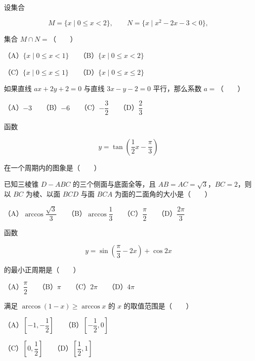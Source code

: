 \begin{question}
设集合

\nopagebreak[4]
\[
M=\{x\mid 0\leqslant x<2\},\qquad
N=\{x\mid x^2-2x-3<0\},
\]

集合 $M\cap N=$\mbox{（　　）}

（A）$\{x\mid 0\leqslant x<1\}$　　（B）$\{x\mid 0\leqslant x<2\}$

（C）$\{x\mid 0\leqslant x\leqslant 1\}$　　（D）$\{x\mid 0\leqslant x\leqslant 2\}$

\end{question}
\begin{question}
如果直线 $ax+2y+2=0$ 与直线 $3x-y-2=0$ 平行，那么系数 $a=$\mbox{（　　）}

（A）$-3$　　（B）$-6$　　（C）$-\dfrac32$　　（D）$\dfrac23$

\Needspace{0.4\textheight}
\end{question}
\begin{question}
函数

\nopagebreak[4]
\[
y=\tan\left(\dfrac12x-\dfrac\pi3\right)
\]

在一个周期内的图象是\mbox{（　　）}
\nopagebreak[4]
\begin{center}\end{center}
\nopagebreak[4]
\end{question}
\begin{question}
已知三棱锥 $D-ABC$ 的三个侧面与底面全等，且 $AB=AC=\sqrt3$，$BC=2$，则以 $BC$ 为棱、以面 $BCD$ 与面 $BCA$ 为面的二面角的大小是\mbox{（　　）}

（A）$\arccos\dfrac{\sqrt3}{3}$　　（B）$\arccos\dfrac13$　　（C）$\dfrac\pi2$　　（D）$\dfrac{2\pi}3$

\end{question}
\begin{question}
函数

\nopagebreak[4]
\[
y=\sin\left(\dfrac\pi3-2x\right)+\cos2x
\]

的最小正周期是\mbox{（　　）}

（A）$\dfrac\pi2$　　（B）$\pi$　　（C）$2\pi$　　（D）$4\pi$

\end{question}
\begin{question}
满足 $\arccos(1-x)\geqslant\arccos x$ 的 $x$ 的取值范围是\mbox{（　　）}

（A）$\left[-1,-\dfrac12\right]$　　（B）$\left[-\dfrac12,0\right]$

（C）$\left[0,\dfrac12\right]$　　（D）$\left[\dfrac12,1\right]$

\end{question}
